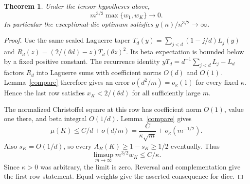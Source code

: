 \documentclass[11pt]{article}
\newtheorem{theorem}{Theorem}
\begin{document}
\begin{theorem}
Under the tensor hypotheses above,
\[
 m^{3/2}\max\{w_1,w_K\}\longrightarrow0.
\]
In particular the exceptional-die optimum satisfies
$g(n)/n^{3/2}\to\infty$.
\end{theorem}
\begin{proof}
Use the same scaled Laguerre taper
$T_d(y)=\sum_{j<d}(1-j/d)L_j(y)$ and
$R_d(z)=(2/(\theta d)-z)T_d(\theta z)^2$.
Its beta expectation is bounded below by a fixed positive constant.
The recurrence identity
$yT_d=d^{-1}\sum_{j<d}L_j-L_d$ factors $R_d$ into Laguerre sums
with coefficient norms $O(d)$ and $O(1)$. Lemma~\ref{compare} therefore
gives an error $o(d^2/m)=o_\kappa(1)$ for every fixed $\kappa$.
Hence the last row satisfies $x_K<2/(\theta d)$ for all sufficiently
large $m$.

The normalized Christoffel square at this row has coefficient norm
$O(1)$, value one there, and beta integral $O(1/d)$.
Lemma~\ref{compare} gives
\[
 \mu(K)\le C/d+o(d/m)=\frac{C}{\kappa\sqrt m}
                       +o_\kappa(m^{-1/2}).
\]
Also $s_K=O(1/d)$, so every $A_B(K)\ge1-s_K\ge1/2$ eventually.
Thus
\[
 \limsup_{m\to\infty}m^{3/2}w_K\le C/\kappa.
\]
Since $\kappa>0$ was arbitrary, the limit is zero. Reversal and
complementation give the first-row statement. Equal weights give
the asserted consequence for dice.
\end{proof}
\end{document}
